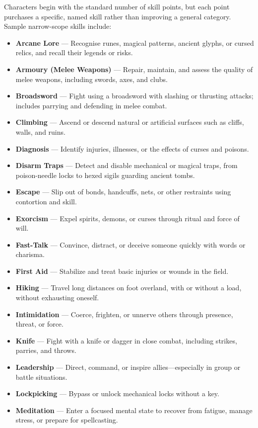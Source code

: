 Characters begin with the standard number of skill points, but each point purchases a specific, named skill rather than improving a general category. Sample narrow-scope skills include:
\begin{itemize}\raggedright
    \item \textbf{Arcane Lore} — Recognise runes, magical patterns, ancient glyphs, or cursed relics, and recall their legends or risks.
    \item \textbf{Armoury (Melee Weapons)} — Repair, maintain, and assess the quality of melee weapons, including swords, axes, and clubs.
    \item \textbf{Broadsword} — Fight using a broadsword with slashing or thrusting attacks; includes parrying and defending in melee combat.
    \item \textbf{Climbing} — Ascend or descend natural or artificial surfaces such as cliffs, walls, and ruins.
    \item \textbf{Diagnosis} — Identify injuries, illnesses, or the effects of curses and poisons.
    \item \textbf{Disarm Traps} — Detect and disable mechanical or magical traps, from poison-needle locks to hexed sigils guarding ancient tombs.
    \item \textbf{Escape} — Slip out of bonds, handcuffs, nets, or other restraints using contortion and skill.
    \item \textbf{Exorcism} — Expel spirits, demons, or curses through ritual and force of will.
    \item \textbf{Fast-Talk} — Convince, distract, or deceive someone quickly with words or charisma.
    \item \textbf{First Aid} — Stabilize and treat basic injuries or wounds in the field.
    \item \textbf{Hiking} — Travel long distances on foot overland, with or without a load, without exhausting oneself.
    \item \textbf{Intimidation} — Coerce, frighten, or unnerve others through presence, threat, or force.
    \item \textbf{Knife} — Fight with a knife or dagger in close combat, including strikes, parries, and throws.
    \item \textbf{Leadership} — Direct, command, or inspire allies—especially in group or battle situations.
    \item \textbf{Lockpicking} — Bypass or unlock mechanical locks without a key.
    \item \textbf{Meditation} — Enter a focused mental state to recover from fatigue, manage stress, or prepare for spellcasting.

\end{itemize}
